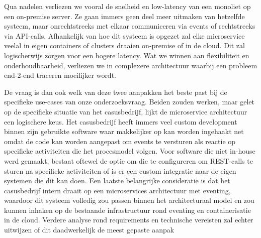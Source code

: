 Qua nadelen verliezen we vooral de snelheid en low-latency van een monoliet op een on-premise server. Ze gaan immers geen deel meer uitmaken van hetzelfde systeem, maar onrechtstreeks met elkaar communiceren via events of rechtstreeks via API-calls. Afhankelijk van hoe dit systeem is opgezet zal elke microservice veelal in eigen containers of clusters draaien on-premise of in de cloud. Dit zal logischerwijs zorgen voor een hogere latency. Wat we winnen aan flexibiliteit en onderhoudbaarheid, verliezen we in complexere architectuur waarbij een probleem end-2-end traceren moeilijker wordt. \autocite[pp. 8-22]{Janiesch2012} \newline

De vraag is dan ook welk van deze twee aanpakken het beste past bij de specifieke use-cases van onze onderzoeksvraag. Beiden zouden werken, maar gelet op de specifieke situatie van het casusbedrijf, lijkt de microservice architectuur een logischere keus. Het casusbedrijf heeft immers veel custom development binnen zijn gebruikte software waar makkelijker op kan worden ingehaakt net omdat de code kan worden aangepast om events te versturen als reactie op specifieke activiteiten die het procesmodel volgen. Voor software die niet in-house werd gemaakt, bestaat oftewel de optie om die te configureren om REST-calls te sturen na specifieke activiteiten of is er een custom integratie naar de eigen systemen die dit kan doen. Een laatste belangrijke consideratie is dat het casusbedrijf intern draait op een microservices architectuur met eventing, waardoor dit systeem volledig zou passen binnen het architecturaal model en zou kunnen inhaken op de bestaande infrastructuur rond eventing en containerisatie in de cloud. Verdere analyse rond requirements en technische vereisten zal echter uitwijzen of dit daadwerkelijk de meest gepaste aanpak \newline
